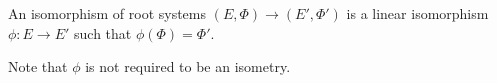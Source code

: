 An isomorphism of root systems $(E, \Phi)\to (E', \Phi')$ is a linear
isomorphism $\phi\colon E\to E'$ such that $\phi(\Phi) = \Phi'$.

Note that $\phi$ is not required to be an isometry.
